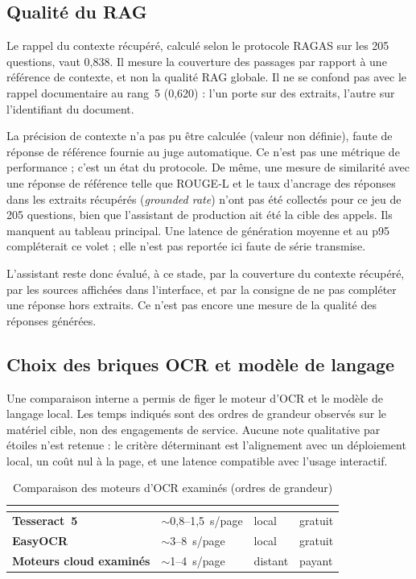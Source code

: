 \subsection{Qualité du RAG}

Le rappel du contexte récupéré, calculé selon le protocole RAGAS  sur les 205 questions, vaut 0,838. Il mesure la couverture des passages par rapport à une référence de contexte, et non la \og qualité RAG\fg{} globale. Il ne se confond pas avec le rappel documentaire au rang~5 (0,620) : l'un porte sur des extraits, l'autre sur l'identifiant du document.

La précision de contexte n'a pas pu être calculée (valeur non définie), faute de réponse de référence fournie au juge automatique. Ce n'est pas une métrique de performance ; c'est un état du protocole. De même, une mesure de similarité avec une réponse de référence telle que ROUGE-L  et le taux d'ancrage des réponses dans les extraits récupérés (\textit{grounded rate}) n'ont pas été collectés pour ce jeu de 205 questions, bien que l'assistant de production ait été la cible des appels. Ils manquent au tableau principal. Une latence de génération moyenne et au p95 compléterait ce volet ; elle n'est pas reportée ici faute de série transmise.

L'assistant reste donc évalué, à ce stade, par la couverture du contexte récupéré, par les sources affichées dans l'interface, et par la consigne de ne pas compléter une réponse hors extraits. Ce n'est pas encore une mesure de la qualité des réponses générées.

\subsection{Choix des briques OCR et modèle de langage}
\label{sec:eval-choix-briques}

Une comparaison interne a permis de figer le moteur d'OCR et le modèle de langage local. Les temps indiqués sont des ordres de grandeur observés sur le matériel cible, non des engagements de service. Aucune note qualitative par étoiles n'est retenue : le critère déterminant est l'alignement avec un déploiement local, un coût nul à la page, et une latence compatible avec l'usage interactif.

\begin{table}[htbp]
\centering
\caption{Comparaison des moteurs d'OCR examinés (ordres de grandeur)}
\label{tab:choix-ocr}
\small
\renewcommand{\arraystretch}{1.40}
\begingroup
{}
\begin{tabularx}{\textwidth}{@{}>{\bfseries}L{3.4cm}YYY@{}}
\toprule
{}
 &
 &
 &
 \\
\midrule
Tesseract~5 & $\sim$0,8--1,5~s/page & local & gratuit \\
EasyOCR & $\sim$3--8~s/page & local & gratuit \\
Moteurs cloud examinés & $\sim$1--4~s/page & distant & payant \\
\bottomrule
\end{tabularx}
\endgroup
\end{table}

